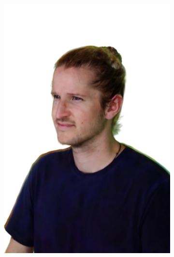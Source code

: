 \begin{figure}[ht]
\begin{subfigure}{0.2\linewidth}
		\includegraphics[width=\textwidth]{Figures/failed/rabbit/32_render-removebg-preview.png}
	\end{subfigure}
	\begin{subfigure}{0.2\linewidth}

\end{subfigure}
\end{figure}
